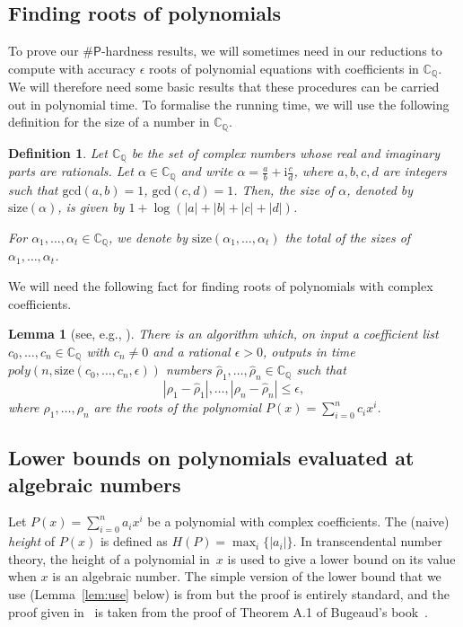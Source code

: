 \documentclass[11pt]{article}
\newtheorem{lemma}[theorem]{Lemma}
\newtheorem{definition}[theorem]{Definition}
\def\numP{\#\mathsf{P}}
\def\CQ{\mathbb{C}_{\mathbb{Q}}}
\newcommand{\size}[1]{\mathrm{size}(#1)}
\begin{document}
\subsection{Finding roots of polynomials}
To prove our $\numP$-hardness results,  we will sometimes need in our reductions to compute with  accuracy $\epsilon$ roots of polynomial equations with coefficients in $\CQ$. We will therefore need some basic results that these procedures can be carried out in polynomial time. To formalise the running time, we will use the following definition for the size of a number in $\CQ$. 

 
\begin{definition}\label{def:CQ}
Let $\CQ$ be the set of complex numbers whose real and imaginary parts are rationals. Let $\alpha\in\CQ$ and write $\alpha=\displaystyle\frac{a}{b}+\mathrm{i}\frac{c}{d}$, where  $a,b,c,d$ are integers such that $\mathrm{gcd}(a,b)=1$, $\mathrm{gcd}(c,d)=1$. Then, the \emph{size} of $\alpha$, denoted by $\size{\alpha}$, is given by $1+\log(|a|+|b|+|c|+|d|)$.

For $\alpha_1,\hdots,\alpha_t\in \CQ$, we denote by $\size{\alpha_1,\hdots,\alpha_t}$ the total of the sizes of $\alpha_1,\hdots,\alpha_t$.
\end{definition}


We will need the following fact for finding roots of polynomials with complex coefficients.
\begin{lemma}[see, e.g., {\cite{NEFF}}]\label{fact:root}
There is an algorithm which, on input a coefficient list $c_0,\hdots,c_n\in \CQ$ 
with $c_n\neq 0$
and a rational $\epsilon>0$, outputs in time $poly(n,\size{c_0,\hdots,c_n,\epsilon})$ numbers $\hat{\rho}_1,\hdots,\hat{\rho}_n\in \CQ$ such that 
\[|\rho_1-\hat{\rho}_1|,\hdots,|\rho_n-\hat{\rho}_n|\leq \epsilon,\]
where ${\rho}_1,\hdots,{\rho}_n$ are the roots of the polynomial $P(x)=\sum^n_{i=0}c_ix^i$.
\end{lemma}





\subsection{Lower bounds on polynomials evaluated at algebraic numbers}
Let 
$P(x) = \sum_{i=0}^n a_i x^i$ 
be a polynomial with complex coefficients.
The (naive) \emph{height} of $P(x)$ is defined as
$H(P) = \max_i \{|a_i|\}$. 
In transcendental number theory, 
the height of a polynomial in~$x$ is used to give a lower bound on its value
when  $x$ is an algebraic number.  The simple version of the lower bound
 that we use (Lemma~\ref{lem:use} below)  is from \cite[Lemma 6.3]{ComplexIsing} 
but the proof  is entirely standard, and
the proof given in~\cite{ComplexIsing}
 is taken  from the proof of Theorem A.1 of Bugeaud's book~\cite{Bug04}. 
\end{document}
